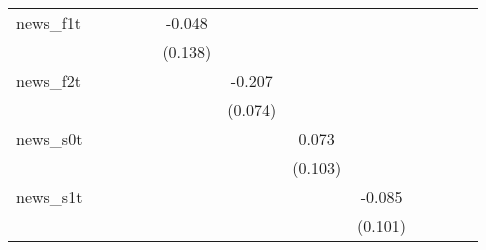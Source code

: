 {\begin{tabular}{l*{12}{c}}
\addlinespace
news\_f1t    &                     &                     &                     &                     &      -0.048         &                     &                     &                     &                     &                     &                     &                     \\
            &                     &                     &                     &                     &     (0.138)         &                     &                     &                     &                     &                     &                     &                     \\
\addlinespace
news\_f2t    &                     &                     &                     &                     &                     &      -0.207\sym{**} &                     &                     &                     &                     &                     &                     \\
            &                     &                     &                     &                     &                     &     (0.074)         &                     &                     &                     &                     &                     &                     \\
\addlinespace
news\_s0t    &                     &                     &                     &                     &                     &                     &       0.073         &                     &                     &                     &                     &                     \\
            &                     &                     &                     &                     &                     &                     &     (0.103)         &                     &                     &                     &                     &                     \\
\addlinespace
news\_s1t    &                     &                     &                     &                     &                     &                     &                     &      -0.085         &                     &                     &                     &                     \\
            &                     &                     &                     &                     &                     &                     &                     &     (0.101)         &                     &                     &                     &                     \\

\end{tabular}}
